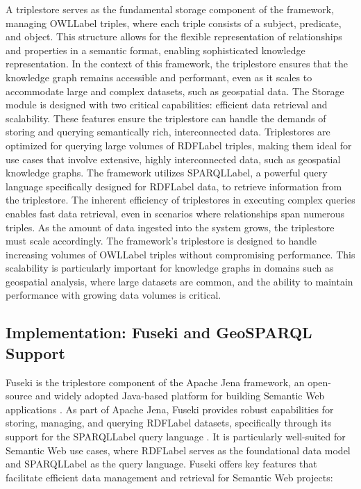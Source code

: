A triplestore serves as the fundamental storage component of the framework, managing \acrshort{OWLLabel} triples, where each triple consists of a subject, predicate, and object. This structure allows for the flexible representation of relationships and properties in a semantic format, enabling sophisticated knowledge representation. In the context of this framework, the triplestore ensures that the knowledge graph remains accessible and performant, even as it scales to accommodate large and complex datasets, such as geospatial data. The Storage module is designed with two critical capabilities: efficient data retrieval and scalability. These features ensure the triplestore can handle the demands of storing and querying semantically rich, interconnected data. Triplestores are optimized for querying large volumes of \acrshort{RDFLabel} triples, making them ideal for use cases that involve extensive, highly interconnected data, such as geospatial knowledge graphs. The framework utilizes \acrshort{SPARQLLabel}\cite{ericprudhommeauxSPARQLQueryLanguage2008}, a powerful query language specifically designed for \acrshort{RDFLabel} data, to retrieve information from the triplestore. The inherent efficiency of triplestores in executing complex queries enables fast data retrieval, even in scenarios where relationships span numerous triples. As the amount of data ingested into the system grows, the triplestore must scale accordingly. The framework's triplestore is designed to handle increasing volumes of \acrshort{OWLLabel} triples without compromising performance. This scalability is particularly important for knowledge graphs in domains such as geospatial analysis, where large datasets are common, and the ability to maintain performance with growing data volumes is critical.

\subsection{Implementation: Fuseki and GeoSPARQL Support}\label{VI-subsec:fuseki}

Fuseki is the triplestore component of the Apache Jena framework, an open-source and widely adopted Java-based platform for building Semantic Web applications \cite{ApacheJenaFramework}. As part of Apache Jena, Fuseki provides robust capabilities for storing, managing, and querying \acrshort{RDFLabel} datasets, specifically through its support for the \acrshort{SPARQLLabel} query language \cite{ApacheJenaFuseki}. It is particularly well-suited for Semantic Web use cases, where \acrshort{RDFLabel} serves as the foundational data model and \acrshort{SPARQLLabel} as the query language. Fuseki offers key features that facilitate efficient data management and retrieval for Semantic Web projects:

